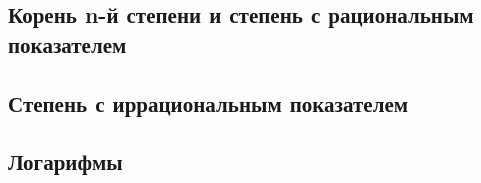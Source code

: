 \documentclass[10pt, a4paper]{article}
\begin{document}
	\subsection{Корень n-й степени и степень с рациональным показателем}
	\subsection{Степень с иррациональным показателем}
	\subsection{Логарифмы}
\end{document}
